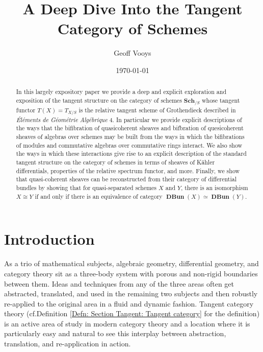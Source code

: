 \documentclass{amsart}
\title{A Deep Dive Into the Tangent Category of Schemes}
\author{Geoff Vooys}
\date{\today}
\theoremstyle{definition}
\DeclareMathOperator{\DBun}{\mathbf{DBun}}
\numberwithin{equation}{subsection}
\begin{document}
\begin{abstract}
In this largely expository paper we provide a deep and explicit exploration and exposition of the tangent structure on the category of schemes $\mathbf{Sch}_{/S}$ whose tangent functor $T(X) = T_{X/S}$ is the relative tangent scheme of Grothendieck described in \emph{{\'E}l{\'e}ments de G{\'e}om{\'e}trie Alg{\'e}brique} 4. In particular we provide explicit descriptions of the ways that the bifibration of quasicoherent sheaves and bifbration of quesicoherent sheaves of algebras over schemes may be built from the ways in which the bifibrations of modules and commutative algebras over commutative rings interact. We also show the ways in which these interactions give rise to an explicit description of the standard tangent structure on the category of schemes in terms of sheaves of K{\"a}hler differentials, properties of the relative spectrum functor, and more. Finally, we show that quasi-coherent sheaves can be reconstructed from their category of differential bundles by showing that for quasi-separated schemes $X$ and $Y$, there is an isomorphism $X \cong Y$ if and only if there is an equivalence of category $\DBun(X) \simeq \DBun(Y)$.
\end{abstract}



\maketitle
\tableofcontents

	
\section{Introduction}

As a trio of mathematical subjects, algebraic geometry, differential geometry, and category theory sit as a three-body system with porous and non-rigid boundaries between them. Ideas and techniques from any of the three areas often get abstracted, translated, and used in the remaining two subjects and then robustly re-applied to the original area in a fluid and dynamic fashion. Tangent category theory (cf.\@ Definition \ref{Defn: Section Tangent: Tangent category} for the definition) is an active area of study in modern category theory and a location where it is particularly easy and natural to see this interplay between abstraction, translation, and re-application in action. 
\end{document}
